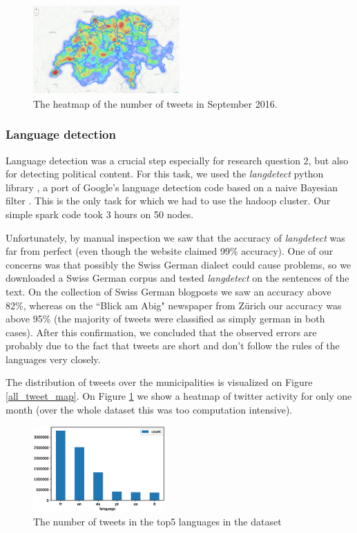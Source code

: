 \begin{figure}[h]
  \includegraphics[width=0.5\textwidth]{images/heat_map.png}
  \caption{The heatmap of the number of tweets in September 2016.}
  \label{heat_map}
\end{figure}



\subsubsection{Language detection}

Language detection was a crucial step especially for research question 2, but also for detecting political content. For this task, we used the \textit{langdetect} python library \cite{pylangdetect}, a port of Google's language detection code based on a naive Bayesian filter \cite{nakatani2010langdetect}. This is the only task for which we had to use the hadoop cluster. Our simple spark code took 3 hours on 50 nodes.

Unfortunately, by manual inspection we saw that the accuracy of \textit{langdetect} was far from perfect (even though the website claimed 99\% accuracy). One of our concerns was that possibly the Swiss German dialect could cause problems, so we downloaded a Swiss German corpus and tested \textit{langdetect} on the sentences of the text. On the collection of Swiss German blogposts we saw an accuracy above 82\%, whereas on the ``Blick am Abig" newspaper from Z\"urich our accuracy was above 95\% (the majority of tweets were classified as simply german in both cases). After this confirmation, we concluded that the observed errors are probably due to the fact that tweets are short and don't follow the rules of the languages very closely. 

The distribution of tweets over the municipalities is visualized on Figure \ref{all_tweet_map}. On Figure \ref{heat_map} we show a heatmap of twitter activity for only one month (over the whole dataset this was too computation intensive).

\begin{figure}[h]
  \includegraphics[width=0.45\textwidth]{images/swiss_counts.eps}
  \caption{The number of tweets in the top5 languages in the dataset}
  \label{swiss_counts}
\end{figure}



